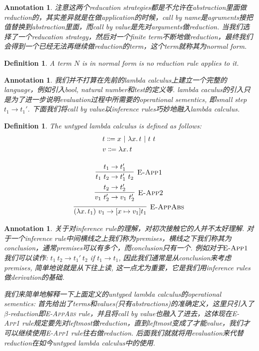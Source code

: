 \documentclass{article}
\newtheorem{definition}[theorem]{Definition}
\newtheorem{annotation}[theorem]{Annotation}
\newcommand{\lam}[2]{\ensuremath{\lambda #1\ldotp #2}} %
\begin{document}
\begin{annotation}
\rm 注意这两个reducation strategies都是不允许在abstraction里面做reduction的，其实差异就是在做application的时候，call by name是agruments接把值替换到abstraction里面，而call by value是先对arguments做reduction. 当我们选择了一个reducation strategy，然后对一个finite term不断地做reduction，最终我们会得到一个已经无法再继续做reduction的term，这个term就称其为\emph{normal form}.
\end{annotation}

\begin{definition}
\rm A term $N$ is in \emph{normal form} is no reduction rule applies to it.
\end{definition}

\begin{annotation}
\rm 我们并不打算在先前的lambda calculus上建立一个完整的language，例如引入bool, natural number和test的定义等. lambda caculus的引入只是为了进一步说明evaluation过程中所需要的\emph{operational sementics}, 即small step $t_1 \to t_1'$. 下面我们将\emph{call by value}以inference rules巧妙地融入lambda calculus.
\end{annotation}

\begin{definition}
\rm The untyped lambda calculus is defined as follows:
\[
	\begin{gathered}
	\begin{aligned}
	&t \Coloneqq x ~|~ \lam{x}{t} ~|~ t~t \\
	&v \Coloneqq \lam{x}{t}
	\end{aligned} \\[1em]
	\infer[\textsc{E-App1}]{t_1~t_2 \to t_1'~t_2}{t_1 \to t_1'} \\
	\infer[\textsc{E-App2}]{v_1~t_2' \to v_1~t_2'}{t_2 \to t_2'} \\
	\infer[\textsc{E-AppAbs}]{(\lam{x}{t_1})~v_1 \to [x \mapsto v_1] t_1}{}
	\end{gathered}
\]
\end{definition}

\begin{annotation}
\rm 关于对inference rule的理解，对初次接触它的人并不太好理解. 对于一个inference rule中间横线之上我们称为premises，横线之下我们称其为conclusion，通常premises可以有多个，而conclusion只有一个. 例如对于$\textsc{E-App1}$我们可以读作: $t_1~t_2 \to t_1'~t_2$ if $t_1 \to t_1$, 因此我们通常是从conclusion来考虑premises, 简单地说就是从下往上读, 这一点尤为重要，它是我们用inference rules做derivation的基础. 

我们来简单地解释一下上面定义的untyped lambda calculus的operational sementics: 首先给出了terms和values(只有abstractions)的准确定义，这里只引入了$\beta$-reduction即\textsc{E-AppAbs} rule，并且将\emph{call by value}也融入了进去，这体现在\textsc{E-App1} rule规定要先对leftmost做reduction，直到leftmost变成了才能value，我们才可以继续使用\textsc{E-App1} rule往右做reduction. 后面我们就就将用evaluation来代替reduction在如今untyped lambda calculus中的使用.
\end{annotation}
\end{document}

